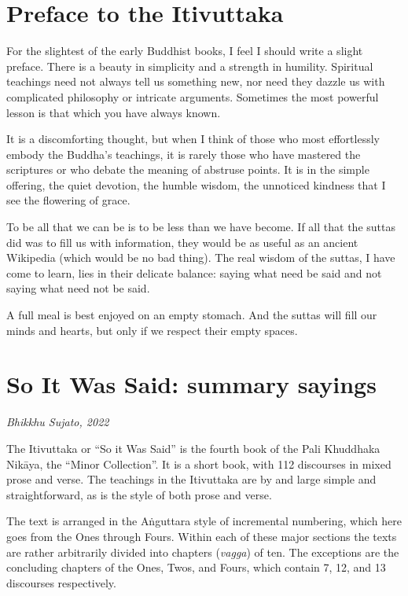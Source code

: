 \documentclass[12pt,openany]{book}%
\newcommand*{\scbyline}[1]{\begin{flushright}\textit{#1}\end{flushright}\bigskip}
\begin{document}
%
\chapter*{Preface to the Itivuttaka}

For the slightest of the early Buddhist books, I feel I should write a slight preface. There is a beauty in simplicity and a strength in humility. Spiritual teachings need not always tell us something new, nor need they dazzle us with complicated philosophy or intricate arguments. Sometimes the most powerful lesson is that which you have always known.

It is a discomforting thought, but when I think of those who most effortlessly embody the Buddha’s teachings, it is rarely those who have mastered the scriptures or who debate the meaning of abstruse points. It is in the simple offering, the quiet devotion, the humble wisdom, the unnoticed kindness that I see the flowering of grace.

To be all that we can be is to be less than we have become. If all that the suttas did was to fill us with information, they would be as useful as an ancient Wikipedia (which would be no bad thing). The real wisdom of the suttas, I have come to learn, lies in their delicate balance: saying what need be said and not saying what need not be said.

A full meal is best enjoyed on an empty stomach. And the suttas will fill our minds and hearts, but only if we respect their empty spaces.

%
\chapter*{So It Was Said: summary sayings}

\scbyline{Bhikkhu Sujato, 2022}

The Itivuttaka or “So it Was Said” is the fourth book of the Pali Khuddhaka \textsanskrit{Nikāya}, the “Minor Collection”. It is a short book, with 112 discourses in mixed prose and verse.  The teachings in the Itivuttaka are by and large simple and straightforward, as is the style of both prose and verse.

The text is arranged in the \textsanskrit{Aṅguttara} style of incremental numbering, which here goes from the Ones through Fours. Within each of these major sections the texts are rather arbitrarily divided into chapters (\emph{vagga}) of ten. The exceptions are the concluding chapters of the Ones, Twos, and Fours, which contain 7, 12, and 13 discourses respectively.
\end{document}
